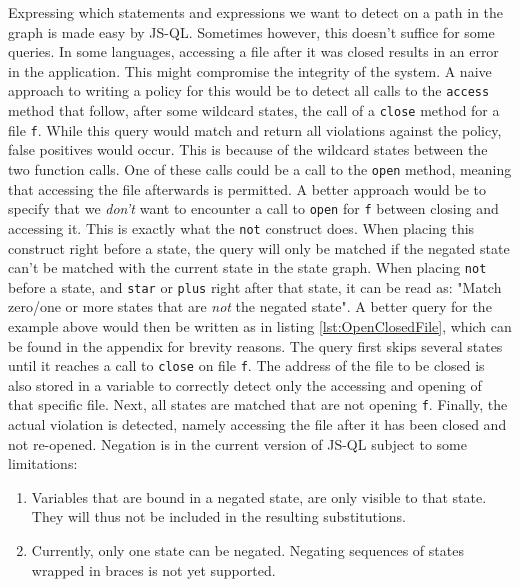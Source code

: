 Expressing which statements and expressions we want to detect on a path in the graph is made easy by JS-QL. Sometimes however, this doesn't suffice for some queries. In some languages, accessing a file after it was closed results in an error in the application. This might compromise the integrity of the system. A naive approach to writing a policy for this would be to detect all calls to the \texttt{access} method that follow, after some wildcard states, the call of a \texttt{close} method for a file \texttt{f}. While this query would match and return all violations against the policy, false positives would occur. This is because of the wildcard states between the two function calls. One of these calls could be a call to the \texttt{open} method, meaning that accessing the file afterwards is permitted.  A better approach would be to specify that we \textit{don't} want to encounter a call to \texttt{open} for \texttt{f} between closing and accessing it. This is exactly what the \texttt{not} construct does. When placing this construct right before a state, the query will only be matched if the negated state can't be matched with the current state in the state graph. When placing \texttt{not} before a state, and \texttt{star} or \texttt{plus} right after that state, it can be read as: "Match zero/one or more states that are \textit{not} the negated state". A better query for the example above would then be written as in listing \ref{lst:OpenClosedFile}, which can be found in the appendix for brevity reasons. The query first skips several states until it reaches a call to \texttt{close} on file \texttt{f}. The address of the file to be closed is also stored in a variable to correctly detect only the accessing and opening of that specific file. Next, all states are matched that are not opening \texttt{f}. Finally, the actual violation is detected, namely accessing the file after it has been closed and not re-opened. Negation is in the current version of JS-QL subject to some limitations: 
\begin{enumerate}
\item Variables that are bound in a negated state, are only visible to that state. They will thus not be included in the resulting substitutions.
\item Currently, only one state can be negated. Negating sequences of states wrapped in braces is not yet supported.
\end{enumerate}


